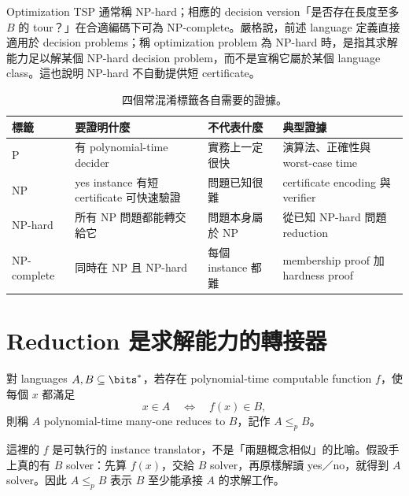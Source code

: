 \documentclass[11pt,a4paper,oneside,openany]{book}
\begin{document}
Optimization TSP 通常稱 NP-hard；相應的 decision version「是否存在長度至多 $B$ 的 tour？」在合適編碼下可為 NP-complete。嚴格說，前述 language 定義直接適用於 decision problems；稱 optimization problem 為 NP-hard 時，是指其求解能力足以解某個 NP-hard decision problem，而不是宣稱它屬於某個 language class。這也說明 NP-hard 不自動提供短 certificate。

\begin{table}[htbp]
\centering
\caption{四個常混淆標籤各自需要的證據。}
\label{tab:complexity-classes}
\begin{tabularx}{\textwidth}{@{}lYYY@{}}
\toprule
標籤 & 要證明什麼 & 不代表什麼 & 典型證據 \\
\midrule
$\mathrm P$ & 有 polynomial-time decider & 實務上一定很快 & 演算法、正確性與 worst-case time \\
$\mathrm{NP}$ & yes instance 有短 certificate 可快速驗證 & 問題已知很難 & certificate encoding 與 verifier \\
NP-hard & 所有 NP 問題都能轉交給它 & 問題本身屬於 NP & 從已知 NP-hard 問題 reduction \\
NP-complete & 同時在 NP 且 NP-hard & 每個 instance 都難 & membership proof 加 hardness proof \\
\bottomrule
\end{tabularx}
\end{table}

\section{Reduction 是求解能力的轉接器}
\begin{definition}
對 languages $A,B\subseteq\bits^*$，若存在 polynomial-time computable function $f$，使每個 $x$ 都滿足
\[
 x\in A\quad\Longleftrightarrow\quad f(x)\in B,
\]
則稱 $A$ polynomial-time many-one reduces to $B$，記作 $A\le_p B$。
\end{definition}

這裡的 $f$ 是可執行的 instance translator，不是「兩題概念相似」的比喻。假設手上真的有 $B$ solver：先算 $f(x)$，交給 $B$ solver，再原樣解讀 yes／no，就得到 $A$ solver。因此 $A\le_p B$ 表示 $B$ 至少能承接 $A$ 的求解工作。
\end{document}
